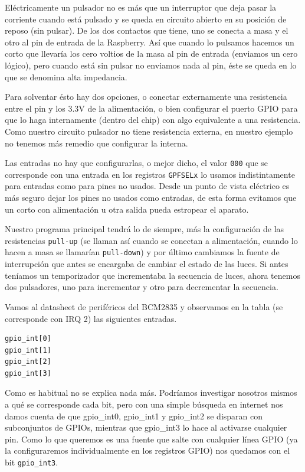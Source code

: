 Eléctricamente un pulsador no es más que un interruptor que deja pasar
la corriente cuando está pulsado y se queda en circuito abierto en su posición de reposo
(sin pulsar). De los dos contactos que tiene, uno se conecta a masa y el otro al pin de
entrada de la Raspberry. Así que cuando lo pulsamos hacemos un corto que llevaría los cero
voltios de la masa al pin de entrada (enviamos un cero lógico), pero cuando está sin pulsar
no enviamos nada al pin, éste se queda en lo que se denomina alta impedancia.

Para solventar ésto hay dos opciones, o conectar externamente una resistencia entre el pin y
los 3.3V de la alimentación, o bien configurar el puerto GPIO para que lo haga internamente
(dentro del chip) con algo equivalente a una resistencia. Como nuestro circuito pulsador no
tiene resistencia externa, en nuestro ejemplo no tenemos más remedio que configurar la interna.

Las entradas no hay que configurarlas, o mejor dicho, el valor {\tt 000} que se corresponde
con una entrada en los registros {\tt GPFSELx} lo usamos indistintamente para entradas como
para pines no usados. Desde un punto de vista eléctrico es más seguro dejar los pines no usados
como entradas, de esta forma evitamos que un corto con alimentación u otra salida pueda estropear
el aparato.

Nuestro programa principal tendrá lo de siempre, más la configuración de las resistencias
{\tt pull-up} (se llaman así cuando se conectan a alimentación, cuando lo hacen a masa se
llamarían {\tt pull-down}) y por último cambiamos la fuente de interrupción que antes se
encargaba de cambiar el estado de las luces. Si antes teníamos un temporizador que
incrementaba la secuencia de luces, ahora tenemos dos pulsadores, uno para incrementar y
otro para decrementar la secuencia.

Vamos al datasheet de periféricos del BCM2835 y observamos en la tabla (se corresponde con
IRQ 2) las siguientes entradas.

\begin{lstlisting}
gpio_int[0]
gpio_int[1]
gpio_int[2]
gpio_int[3]
\end{lstlisting}

Como es habitual no se explica nada más. Podríamos investigar nosotros mismos a qué se corresponde
cada bit, pero con una simple búsqueda en internet nos damos cuenta de que gpio\_int0, gpio\_int1 y
gpio\_int2 se disparan con subconjuntos de GPIOs, mientras que gpio\_int3 lo hace al activarse
cualquier pin. Como lo que queremos es una fuente
que salte con cualquier línea GPIO (ya la configuraremos individualmente en los registros GPIO)
nos quedamos con el bit {\tt gpio\_int3}.

